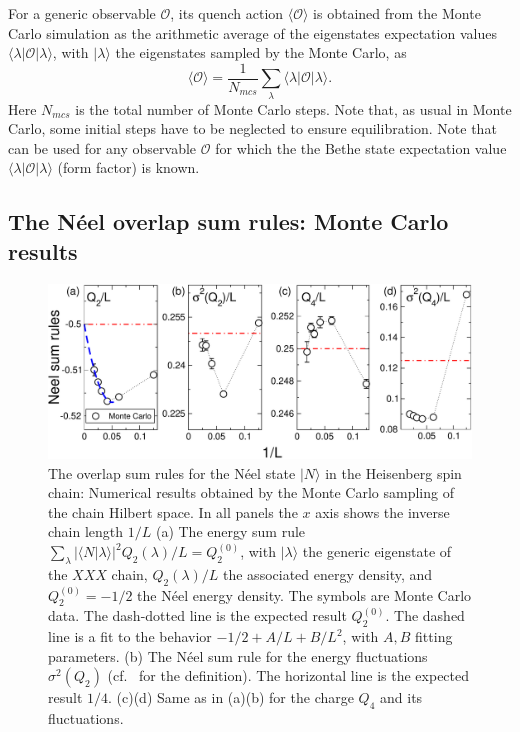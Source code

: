 \documentclass[11pt]{iopart}
\begin{document}
For a generic observable ${\mathcal O}$, its quench action $\langle{\mathcal O}
\rangle$ is obtained from the Monte Carlo simulation as the arithmetic average 
of the eigenstates expectation values $\langle\lambda|{\mathcal O}|\lambda\rangle$, 
with $|\lambda\rangle$ the eigenstates sampled by the Monte Carlo, as 
%
\begin{equation}
\label{qamc-obs}
\langle{\mathcal O}\rangle=\frac{1}{N_{mcs}}\sum\limits_{\lambda}\langle\lambda|
{\mathcal O}|\lambda\rangle. 
\end{equation}
%
Here $N_{mcs}$ is the total number of Monte Carlo steps. Note that, as usual in 
Monte Carlo, some initial steps have to be neglected to ensure equilibration. 
Note that~ can be used for any observable ${\mathcal O}$ for 
which the the Bethe state expectation value $\langle\lambda|{\mathcal O}|\lambda
\rangle$ (form factor) is known. 


\subsection{The N\'eel overlap sum rules: Monte Carlo results}
\label{sec:6.2}

\begin{figure}[t]
\begin{center}
\includegraphics[width=.9\textwidth]{./draft_figs/QAMC_Obs_Neel}
\end{center}
\caption{The overlap sum rules for the N\'eel state $|N\rangle$ in the 
 Heisenberg spin chain: Numerical results obtained by the Monte Carlo 
 sampling of the chain Hilbert space. In all panels the $x$ axis shows 
 the inverse chain length $1/L$ (a) The energy sum rule $\sum_\lambda|
 \langle N|\lambda\rangle|^2Q_2(\lambda)/L=Q^{(0)}_2$, with $|\lambda
 \rangle$ the generic eigenstate of the $XXX$ chain, $Q_2(\lambda)/L$ 
 the associated energy density, and $Q_2^{(0)}=-1/2$ the N\'eel energy 
 density. The symbols are Monte Carlo data. The dash-dotted line is the 
 expected result $Q_2^{(0)}$. The dashed line is a fit to the behavior 
 $-1/2+A/L+B/L^2$, with $A,B$ fitting parameters. (b) The N\'eel sum rule 
 for the energy fluctuations $\sigma^2(Q_2)$ (cf.~ for 
 the definition). The horizontal line is the expected result $1/4$. 
 (c)(d) Same as in (a)(b) for the charge $Q_4$ and its fluctuations. 
}
\label{fig3:neel-qamc-sr}
\end{figure}
\end{document}
